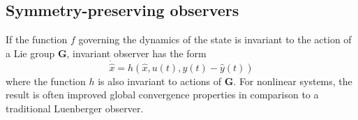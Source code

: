 \subsection{Symmetry-preserving observers}
If the function $f$ governing the dynamics of the state is invariant to the action of a Lie group $\mathbf{G}$, invariant observer has the form
\begin{equation}
	\dot{\hat{x}} = h(\hat{x},u(t),y(t)-\hat{y}(t))
\end{equation}
where the function $h$ is also invariant to actions of $\mathbf{G}$. For nonlinear systems, the result is often improved global convergence properties in comparison to a traditional Luenberger observer.

